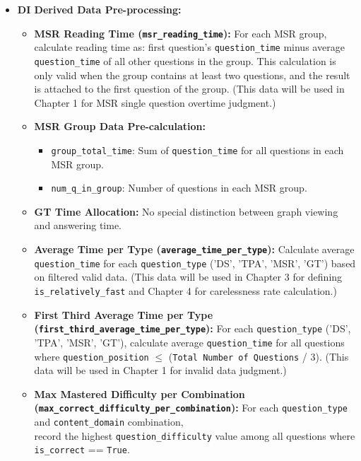 \documentclass{article}
\begin{document}
\begin{itemize}
\begin{itemize}
        \item \textbf{DI Derived Data Pre-processing:}
        \begin{itemize}
            \item \textbf{MSR Reading Time (\texttt{msr\_reading\_time}):} For each MSR group, calculate reading time as: first question's \texttt{question\_time} minus average \texttt{question\_time} of all other questions in the group. This calculation is only valid when the group contains at least two questions, and the result is attached to the first question of the group. (This data will be used in Chapter 1 for MSR single question overtime judgment.)
            \item \textbf{MSR Group Data Pre-calculation:}
                \begin{itemize}
                    \item \texttt{group\_total\_time}: Sum of \texttt{question\_time} for all questions in each MSR group.
                    \item \texttt{num\_q\_in\_group}: Number of questions in each MSR group.
                \end{itemize}
            \item \textbf{GT Time Allocation:} No special distinction between graph viewing and answering time.
            \item \textbf{Average Time per Type (\texttt{average\_time\_per\_type}):} Calculate average \texttt{question\_time} for each \texttt{question\_type} ('DS', 'TPA', 'MSR', 'GT') based on filtered valid data. (This data will be used in Chapter 3 for defining \texttt{is\_relatively\_fast} and Chapter 4 for carelessness rate calculation.)
            \item \textbf{First Third Average Time per Type (\texttt{first\_third\_average\_time\_per\_type}):} For each \texttt{question\_type} ('DS', 'TPA', 'MSR', 'GT'), calculate average \texttt{question\_time} for all questions where \texttt{question\_position} $\leq$ (\texttt{Total Number of Questions} / 3). (This data will be used in Chapter 1 for invalid data judgment.)
            \item \textbf{Max Mastered Difficulty per Combination (\texttt{max\_correct\_difficulty\_per\_combination}):} 
            For each \texttt{question\_type} and \texttt{content\_domain} combination, \\
            record the highest \texttt{question\_difficulty} value among all questions where \texttt{is\_correct} == \texttt{True}.
        \end{itemize}

\end{itemize}
\end{itemize}
\end{document}
